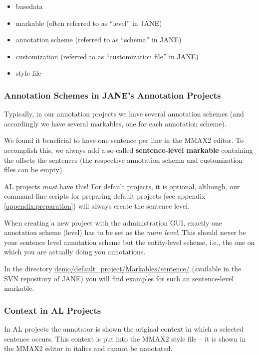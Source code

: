 \documentclass[DIV12,english,11pt,halfparskip]{scrartcl}
\begin{document}
\begin{appendix}
\begin{itemize}
\item basedata
\item markable (often referred to as ``level'' in JANE)
\item annotation scheme (referred to as ``schema'' in JANE)
\item customization (referred to as ``customization file'' in JANE)
\item style file
\end{itemize}


\subsubsection{Annotation Schemes in JANE's Annotation Projects}

Typically, in our annotation projects we have several annotation
schemes (and accordingly we have several markables, one for each
annotation scheme).

We found it beneficial to have one sentence per line in the MMAX2
editor. To accomplish this, we always add a so-called
\textbf{sentence-level markable} containing the offsets the sentences
(the respective annotation schema and customization files can be
empty).

AL projects \emph{must} have this! For default projects, it is
optional, although, our command-line scripts for preparing default
projects (see appendix \ref{appendix:preparation}) will always create
the sentence level.

When creating a new project with the administration GUI, exactly one
annotation scheme (level) has to be set as the \emph{main level}.
This should never be your sentence level annotation scheme but the
entity-level scheme, i.e., the one on which you are actually doing you
annotations.

In the directory \url{demo/default_project/Markables/sentence/}
(available in the SVN repository of JANE) you will find examples for
such an sentence-level markable.



\subsubsection{Context in AL Projects}
In AL projects the annotator is shown the original context in which a
selected sentence occurs. This context is put into the MMAX2 style
file -- it is shown in the MMAX2 editor in italics and cannot be
annotated.


\end{appendix}
\end{document}
